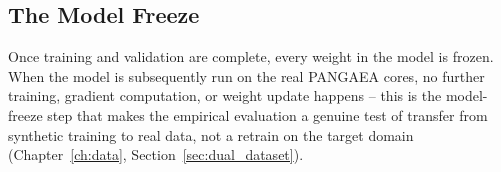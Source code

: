 \subsection{The Model Freeze}

Once training and validation are complete, every weight in the model is frozen. When the model is subsequently run on the real PANGAEA cores, no further training, gradient computation, or weight update happens -- this is the model-freeze step that makes the empirical evaluation a genuine test of transfer from synthetic training to real data, not a retrain on the target domain (Chapter~\ref{ch:data}, Section~\ref{sec:dual_dataset}).
